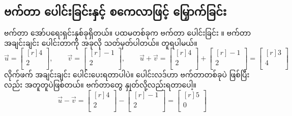 \subsection*{ဗက်တာ ပေါင်းခြင်းနှင့် စကေလာဖြင့် မြှောက်ခြင်း}
ဗက်တာ အော်ပရေးရှင်းနှစ်ခုရှိတယ်။ ပထမတစ်ခုက ဗက်တာ ပေါင်းခြင်း ။  ဗက်တာအချင်းချင်း ပေါင်းတာကို အခုလို သတ်မှတ်ပါတယ်။  တူရပါမယ်။
%
\[
\vec{u} = \begin{bmatrix*}[r] 4\\ 2\\ \end{bmatrix*}, \qquad
\vec{v} = \begin{bmatrix*}[r] -1\\ 2\\ \end{bmatrix*}, \qquad
\vec{u} + \vec{v} = \begin{bmatrix*}[r] 4\\ 2\\ \end{bmatrix*} +  \begin{bmatrix*}[r] -1\\ 2\\ \end{bmatrix*} = \begin{bmatrix*}[r] 3\\ 4\\ \end{bmatrix*}
\]
%
လိုက်ဖက်  အချင်းချင်း ပေါင်းပေးရတာပါပဲ။ ပေါင်းလဒ်ဟာ ဗက်တာတစ်ခုပဲ ဖြစ်ပြီး  လည်း အတူတူပဲဖြစ်တယ်။ ဗက်တာတွေ နှုတ်လို့လည်းရတာပေါ့။ 
%
\[
\vec{u} - \vec{v} = \begin{bmatrix*}[r] 4\\ 2\\ \end{bmatrix*} -  \begin{bmatrix*}[r] -1\\ 2\\ \end{bmatrix*} = \begin{bmatrix*}[r] 5\\ 0\\ \end{bmatrix*}
\]
%

